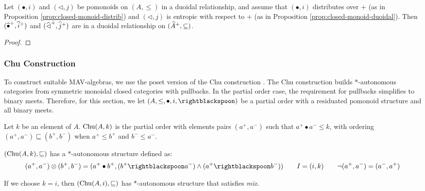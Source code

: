 \begin{proposition}
  Let $(\bullet, i)$ and $(\lhd, j)$ be pomonoids on $(A, \leq)$ in a
  duoidal relationship, and assume that $(\bullet, i)$ distributes
  over $+$ (as in Proposition \ref{prop:closed-monoid-distrib}) and
  $(\lhd, j)$ is entropic with respect to $+$ (as in Proposition
  \ref{prop:closed-monoid-duoidal}). Then
  $(\mathop{\widehat{\bullet}^+}, \mathop{\widehat{i}^+})$ and
  $(\mathop{\widehat{\lhd}^+}, \mathop{\widehat{j}^+})$ are in a duoidal relationship on
  $(\widehat{A}^+, \subseteq)$.
\end{proposition}

\begin{proof}
\end{proof}

\subsubsection{Chu Construction}

To construct suitable MAV-algebras, we use the poset version of the
Chu construction \cite{barr}. The Chu construction builds
$*$-autonomous categories from symmetric monoidal closed categories
with pullbacks. In the partial order case, the requirement for
pullbacks simplifies to binary meets. Therefore, for this section, we
let $(A, \leq, \bullet, i, \rightblackspoon)$ be a partial order with
a residuated pomonoid structure and all binary meets.

\begin{definition}
  Let $k$ be an element of $A$. $\mathrm{Chu}(A, k)$ is the partial order with
  elements pairs $(a^+, a^-)$ such that $a^+ \bullet a^- \leq k$, with
  ordering $(a^+,a^-) \sqsubseteq (b^+, b^-)$ when $a^+ \leq b^+$ and
  $b^- \leq a^-$.
\end{definition}

\begin{proposition}
  $(\mathrm{Chu}(A, k), \sqsubseteq)$ has a $*$-autonomous structure defined
  as:
  \begin{displaymath}
    (a^+, a^-) \otimes (b^+, b^-) = (a^+ \bullet b^+, (b^+ \rightblackspoon a^-) \land (a^+ \rightblackspoon b^-))
    \qquad
    I = (i, k)
    \qquad
    \lnot(a^+,a^-) = (a^-, a^+)
  \end{displaymath}
\end{proposition}

\begin{remark}
  If we choose $k = i$, then $(\mathrm{Chu}(A, i), \sqsubseteq)$ has
  $*$-autonomous structure that satisfies \emph{mix}.
\end{remark}

